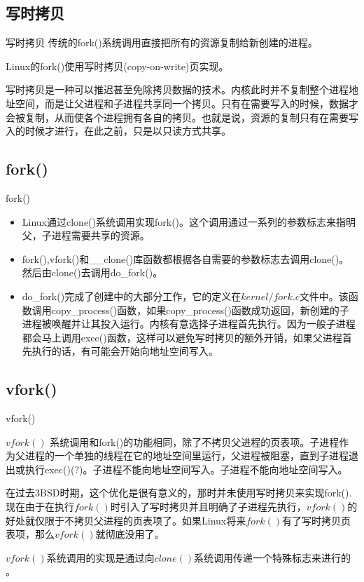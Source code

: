 \documentclass[10pt,compress,mathserif,red]{beamer}
\begin{document}
\begin{CJK*}{UTF8}{gkai}
\subsection{写时拷贝}
\begin{frame}{写时拷贝}
传统的fork()系统调用直接把所有的资源复制给新创建的进程。\\
\begin{alertblock}{}
Linux的fork()使用写时拷贝(copy-on-write)页实现。
\end{alertblock}
写时拷贝是一种可以推迟甚至免除拷贝数据的技术。内核此时并不复制整个进程地址空间，而是让父进程和子进程共享同一个拷贝。只有在需要写入的时候，数据才会被复制，从而使各个进程拥有各自的拷贝。也就是说，资源的复制只有在需要写入的时候才进行，在此之前，只是以只读方式共享。
\end{frame}
\subsection{fork()}
\begin{frame}{fork()}
\begin{itemize}
	\item Linux通过clone()系统调用实现fork()。这个调用通过一系列的参数标志来指明父，子进程需要共享的资源。
	\item fork(),vfork()和\_\_clone()库函数都根据各自需要的参数标志去调用clone()。然后由clone()去调用do\_fork()。
	\item do\_fork()完成了创建中的大部分工作，它的定义在$kernel/fork.c$文件中。该函数调用copy\_process()函数，如果copy\_process()函数成功返回，新创建的子进程被唤醒并让其投入运行。内核有意选择子进程首先执行。因为一般子进程都会马上调用exec()函数，这样可以避免写时拷贝的额外开销，如果父进程首先执行的话，有可能会开始向地址空间写入。
\end{itemize}
\end{frame}
\subsection{vfork()}
\begin{frame}{vfork()}
\begin{block}{}
$vfork()$ 系统调用和fork()的功能相同，除了不拷贝父进程的页表项。子进程作为父进程的一个单独的线程在它的地址空间里运行，父进程被阻塞，直到子进程退出或执行exec()(?)。子进程不能向地址空间写入。子进程不能向地址空间写入。
\end{block}
\begin{block}{}
在过去3BSD时期，这个优化是很有意义的，那时并未使用写时拷贝来实现fork().现在由于在执行$fork()$时引入了写时拷贝并且明确了子进程先执行，$vfork()$的好处就仅限于不拷贝父进程的页表项了。如果Linux将来$fork()$有了写时拷贝页表项，那么$vfork()$就彻底没用了。
\end{block}
$vfork()$系统调用的实现是通过向$clone()$系统调用传递一个特殊标志来进行的 。
\end{frame}

\end{CJK*}
\end{document}
